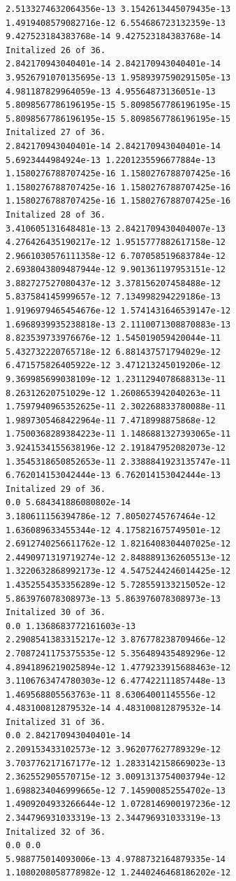 \documentclass[11pt]{article}
\begin{document}
\begin{Verbatim}[commandchars=\\\{\}]
2.5133274632064356e-13 3.1542613445079435e-13
1.4919408579082716e-12 6.554686723132359e-13
9.427523184383768e-14 9.427523184383768e-14
Initalized 26 of 36.
2.842170943040401e-14 2.842170943040401e-14
3.9526791070135695e-13 1.9589397590291505e-13
4.981187829964059e-13 4.95564873136051e-13
5.8098567786196195e-15 5.8098567786196195e-15
5.8098567786196195e-15 5.8098567786196195e-15
Initalized 27 of 36.
2.842170943040401e-14 2.842170943040401e-14
5.6923444984924e-13 1.2201235596677884e-13
1.1580276788707425e-16 1.1580276788707425e-16
1.1580276788707425e-16 1.1580276788707425e-16
1.1580276788707425e-16 1.1580276788707425e-16
Initalized 28 of 36.
3.410605131648481e-13 2.8421709430404007e-13
4.276426435190217e-12 1.9515777882617158e-12
2.9661030576111358e-12 6.707058519683784e-12
2.6938043809487944e-12 9.901361197953151e-12
3.882727527080437e-12 3.378156207458488e-12
5.837584145999657e-12 7.134998294229186e-13
1.9196979465454676e-12 1.5741431646539147e-12
1.6968939935238818e-13 2.1110071308870883e-13
8.823539733976676e-12 1.545019059420044e-11
5.432732220765718e-12 6.881437571794029e-12
6.471575826405922e-12 3.471213245019206e-12
9.369985699038109e-12 1.2311294078688313e-11
8.26312620751029e-12 1.2608653942040263e-11
1.7597940965352625e-11 2.302268833780088e-11
1.9897305468422964e-11 7.4718998875868e-12
1.7500368289384223e-11 1.1486881327393065e-11
3.9241534155638196e-12 2.191847952082073e-12
1.3545318650852653e-11 2.3388841923135747e-11
6.762014153042444e-13 6.762014153042444e-13
Initalized 29 of 36.
0.0 5.684341886080802e-14
3.180611156394786e-12 7.80502745767464e-12
1.636089633455344e-12 4.175821675749501e-12
2.6912740256611762e-12 1.8216408304407025e-12
2.4490971319719274e-12 2.8488891362605513e-12
1.3220632868992173e-12 4.5475244246014425e-12
1.4352554353356289e-12 5.728559133215052e-12
5.863976078308973e-13 5.863976078308973e-13
Initalized 30 of 36.
0.0 1.1368683772161603e-13
2.2908541383315217e-12 3.876778238709466e-12
2.7087241175375535e-12 5.356489435489296e-12
4.8941896219025894e-12 1.4779233915688463e-12
3.1106763474780303e-12 6.477422111857448e-13
1.469568805563763e-11 8.63064001145556e-12
4.483100812879532e-14 4.483100812879532e-14
Initalized 31 of 36.
0.0 2.842170943040401e-14
2.209153433102573e-12 3.962077627789329e-12
3.703776217167177e-12 1.2833142158669023e-13
2.362552905570715e-12 3.0091313754003794e-12
1.6988234046999665e-12 7.145900852554702e-13
1.4909204933266644e-12 1.0728146900197236e-12
2.344796931033319e-13 2.344796931033319e-13
Initalized 32 of 36.
0.0 0.0
5.988775014093006e-13 4.9788732164879335e-14
1.1080208058778982e-12 1.2440246468186202e-12

\end{Verbatim}
\end{document}
